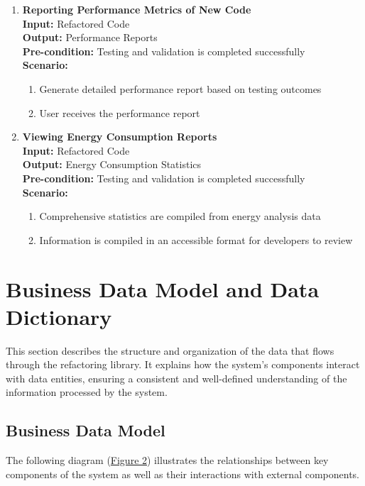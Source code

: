 \documentclass[12pt]{article}
\begin{document}
\begin{enumerate}[label={\bf BUC \arabic*:}, wide=0pt, font=\itshape]
  \item {\bf Reporting Performance Metrics of New Code} \\[2mm]
    \textbf{Input:} Refactored Code \\
    \textbf{Output:} Performance Reports\\
    \textbf{Pre-condition:} Testing and validation is completed
    successfully \\[2mm]
    \textbf{Scenario: }
    \begin{enumerate}[label=\arabic*.]
      \item Generate detailed performance report based on testing outcomes
      \item User receives the performance report
    \end{enumerate}

  \item {\bf Viewing Energy Consumption Reports} \\[2mm]
    \textbf{Input:} Refactored Code \\
    \textbf{Output:} Energy Consumption Statistics \\
    \textbf{Pre-condition:} Testing and validation is completed
    successfully \\[2mm]
    \textbf{Scenario: }
    \begin{enumerate}[label=\arabic*.]
      \item Comprehensive statistics are compiled from energy analysis data
      \item Information is compiled in an accessible format for
        developers to review
    \end{enumerate}
\end{enumerate}

\newpage
\section{Business Data Model and Data Dictionary}

This section describes the structure and organization of the data
that flows through the refactoring library. It explains how the
system's components interact with data entities, ensuring a
consistent and well-defined understanding of the information
processed by the system.

\subsection{Business Data Model}
The following diagram (\hyperref[img:bdata-model]{Figure 2})
illustrates the relationships between key components of the system as
well as their interactions with external components.
\end{document}
